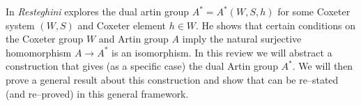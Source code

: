 In \cite{resteghini_free_2024} \emph{Resteghini} explores the dual artin group $A^* = A^*(W,S,h)$ for some Coxeter system $(W,S)$ and Coxeter element $h \in W$.
He shows that certain conditions on the Coxeter group $W$ and Artin group $A$ imply the natural surjective homomorphism $A \to A^*$ is an isomorphism.
In this review we will abstract a construction that gives (as a specific case) the dual Artin group $A^*$. We will then prove a general result about this construction and show that \cite[Proposition 3.9]{resteghini_free_2024} can be re--stated (and re--proved) in this general framework.

